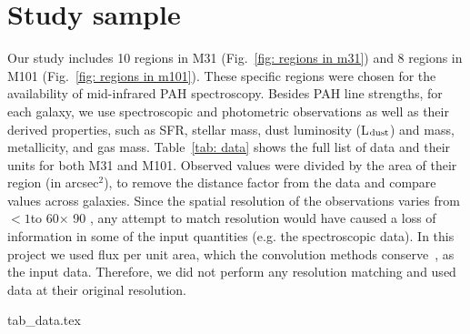 
\section{Study sample}
\label{Sec: data_SOMN}

Our study includes 10 regions in M31 (Fig.~\ref{fig: regions in m31}) and 8 regions in M101 (Fig.~\ref{fig: regions in m101}). 
These specific regions were chosen for the availability of mid-infrared PAH spectroscopy.
Besides PAH line strengths, for each galaxy, we use spectroscopic and photometric observations as well as their derived properties, such as SFR, stellar mass, dust luminosity (L$_{\rm dust}$) and mass, metallicity, and gas mass.
Table~\ref{tab: data} shows the full list of data and their units for both M31 and M101.
Observed values were divided by the area of their region (in arcsec$^2$), to remove the distance factor from the data and compare values across galaxies.
Since the spatial resolution of the observations varies from $<1$\arcsec to 60\arcsec $\times$ 90 \arcsec, any attempt to match resolution would have caused a loss of information in some of the input quantities (e.g. the spectroscopic data).
In this project we used flux per unit area, which the convolution methods conserve~\citep{Aniano12}, as the input data.
Therefore, we did not perform any resolution matching and used data at their original resolution. %


{tab_data.tex}


